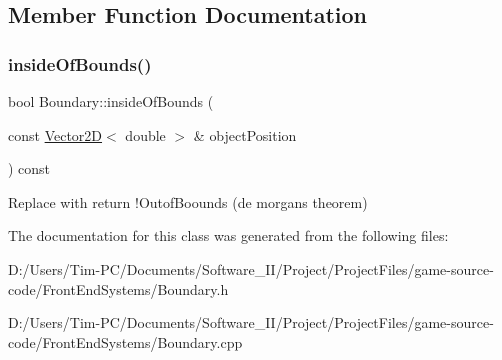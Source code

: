 \subsection{Member Function Documentation}
\mbox{\label{class_boundary_aeb7b795c19f8ad23d8509444a33d473c}} 
\subsubsection{\texorpdfstring{inside\+Of\+Bounds()}{insideOfBounds()}}
{\footnotesize\ttfamily bool Boundary\+::inside\+Of\+Bounds (\begin{DoxyParamCaption}\item[{const \hyperlink{class_vector2_d}{Vector2D}$<$ double $>$ \&}]{object\+Position }\end{DoxyParamCaption}) const}

Replace with return !\+Outof\+Boounds (de morgans theorem) 

The documentation for this class was generated from the following files\+:\begin{DoxyCompactItemize}
\item 
D\+:/\+Users/\+Tim-\/\+P\+C/\+Documents/\+Software\+\_\+\+I\+I/\+Project/\+Project\+Files/game-\/source-\/code/\+Front\+End\+Systems/Boundary.\+h\item 
D\+:/\+Users/\+Tim-\/\+P\+C/\+Documents/\+Software\+\_\+\+I\+I/\+Project/\+Project\+Files/game-\/source-\/code/\+Front\+End\+Systems/Boundary.\+cpp\end{DoxyCompactItemize}
